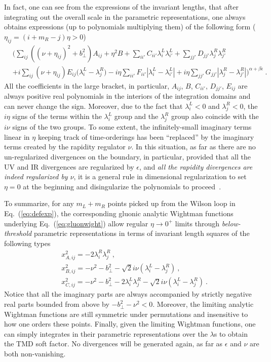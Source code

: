 \documentclass[a4paper,11pt]{article}
\begin{document}
In fact, one can see from the expressions of the invariant lengths, that after integrating out  the overall scale in the parametric representations, one always obtains expressions (up to polynomials multiplying them) of the following form ($\eta_{ij}=(i+m_R-j)\eta>0$)
\begin{align}\label{eq:parametricfull}
&\bigg(\sum_{ij}((\nu+\eta_{ij})^2+b_\perp^2)A_{ij}+\eta^2B+\sum_{ii'}C_{ii'}\lambda^L_i\lambda^L_{i'}+\sum_{jj'}D_{jj'}\lambda^R_j\lambda^R_{j'}\nonumber \\ 
&+i \sum_{ij}(\nu+\eta_{ij}) E_{ij} \bigg(\lambda_i^L-\lambda^R_j\bigg)-i\eta \sum_{ii'}F_{ii'}|\lambda_i^L-\lambda_{i'}^L|+i\eta \sum_{jj'}G_{jj'}|\lambda_j^R-\lambda_{j'}^R|\bigg)^{\alpha+\beta \epsilon} \ .
\end{align}
All the coefficients in the large bracket, in particular, $A_{ij}$, $B$, $C_{ii'}$, $D_{jj'}$, $E_{ij}$ are always positive real polynomials in the interiors of the integration domains and can never change the sign.  Moreover, due to the fact that $\lambda_i^L<0$ and $\lambda^R_j<0$, the $i\eta$ signs of the terms within the $\lambda_i^L$ group and the $\lambda_j^R$ group also coincide with the $i\nu$ signs of the two groups. To some extent, the infinitely-small imaginary terms linear in $\eta$ keeping track of time-orderings has been ``replaced'' by the imaginary terms created by the rapidity regulator $\nu$. In this situation, as far as there are no un-regularized divergences on  the boundary, in particular, provided that all the UV and IR divergences are regularized by $\epsilon$, and {\it all the rapidity divergences are indeed regularized by $\nu$}, it is a general rule in dimensional regularization to set $\eta=0$ at the beginning and disingularize the polynomials to proceed~\cite{Bogner:2007cr}. 


To summarize, for any $m_L+m_R$ points picked up from the Wilson loop in Eq.~(\ref{eq:defexp}), the corresponding gluonic analytic Wightman functions underlying Eq.~(\ref{eq:gluonwight}) allow regular $\eta \rightarrow 0^+$ limits through {\it below-threshold} parametric representations in terms of invariant length squares of the following types
\begin{align}
&x_{A,ij}^2=-2\lambda ^R_i\lambda^R_j \ , \label{eq:invariant1}\\
&x_{B,ij}^2=-\nu^2-b_\perp^2-\sqrt{2}i\nu(\lambda^L_i-\lambda^R_j) \ , \label{eq:invariant2} \\
&x_{C,ij}^2=-\nu^2-b_\perp^2-2\lambda_i^L\lambda^R_j-\sqrt{2}i\nu (\lambda_i^L-\lambda^R_j) \label{eq:invariant3}\ .
\end{align}
Notice that all the imaginary parts are always accompanied by strictly negative real parts bounded from above by $-b^2_\perp-\nu^2<0$. Moreover, the limiting analytic Wightman functions are still symmetric under permutations and insensitive to how one orders these points. Finally, given the limiting Wightman functions, one can simply integrates in their parametric representations over the $\lambda$s to obtain the TMD soft factor. No divergences will be generated again, as far as $\epsilon$ and $\nu$ are both non-vanishing. 
\end{document}
